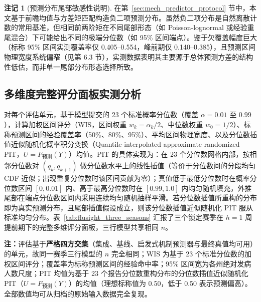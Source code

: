 \documentclass[11pt,a4paper]{article}
\theoremstyle{plain}
\theoremstyle{definition}
\newtheorem*{remark}{注记}
\begin{document}
\begin{remark}[预测分布尾部敏感性说明]\label{rem:tail_sensitivity}
在第~\ref{sec:mech_predictor_protocol} 节中，本文基于前瞻均值与方差矩匹配构造负二项预测分布。虽然负二项分布是自然离散计数的常用基准，但相同前两阶矩在不同尾部形态（如 Poisson-lognormal 或经验重尾混合）下可能给出不同的极端分位数（如 95\% 区间端点）。鉴于欠覆盖幅度巨大（标称 95\% 区间实测覆盖率仅 0.405--0.554，峰前期仅 0.140--0.385），且预测区间物理宽度系统偏窄（见第 6.3 节），实测数据表明其主要源于总体预测方差的结构性低估，而非单一尾部分布形态选择所致。
\end{remark}

\subsection{多维度完整评分面板实测分析}\label{sec:flusight_scores}

对每个评估单元，基于模型提交的 23 个标准概率分位数（覆盖 $\alpha = 0.01$ 至 $0.99$），计算加权区间评分（WIS\citep{bracher2021evaluating}，区间权重 $w_k = \alpha_k/2$、中位数权重 $w_0 = 1/2$）、标称预测区间的经验覆盖率（50\%、80\%、95\%）、平均区间物理宽度、以及分位数插值近似随机化概率积分变换（Quantile-interpolated approximate randomized PIT，$U=F_{\text{预测}}(Y)$）均值。PIT 的具体实现为：在 23 个分位数网格内部，按相邻分位数对 $(q_k, q_{k+1})$ 做分位数水平上的线性插值（等价于分位数间的分段均匀 CDF 近似；出现重复分位数时该区间贡献为零）；真值低于最低分位数时在概率分位数区间 $[0, 0.01]$ 内、高于最高分位数时在 $[0.99, 1.0]$ 内均匀随机填充，外推尾部在端点分位数区间内采用连续均匀随机抽样平滑。若分位数插值所重构的分布即为真实预测分布，且尾部插值假设成立，则该分位数插值近似随机化 PIT 服从标准均匀分布。表~\ref{tab:flusight_three_seasons} 汇报了三个锁定赛季在 $h=1$ 周提前期下的完整多维评分面板，三行模型共享相同 $n$。

\begin{table}[htbp]
\centering
\small
\caption{CDC FluSight 外部审计评分面板：三个锁定历史赛季（$h=1$ 周）}
\label{tab:flusight_three_seasons}
\setlength{\tabcolsep}{3pt}%
%
\vspace{2pt}
\begin{flushleft}
\scriptsize \textbf{注：}评估基于\textbf{严格四方交集}（集成、基线、启发式机制预测器与最终真值均可用）的单元，故同一赛季三行模型的 $n$ 完全相同；WIS 为基于 23 个标准分位数的加权区间评分；覆盖率为标称预测区间的经验命中率；95\% 区间宽为各州绝对发病人数尺度；PIT 均值为基于 23 个报告分位数重构分布的分位数插值近似随机化 PIT（$U=F_{\text{预测}}(Y)$）的均值（理想标称值为 0.50，低于 0.50 表示预测偏高）。全部数值均可从归档的原始输入数据完全复现。\end{flushleft}
\end{table}
\end{document}
